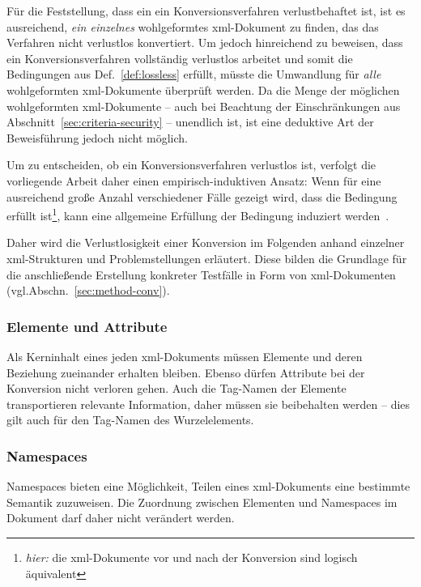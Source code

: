 Für die Feststellung, dass ein ein Konversionsverfahren verlustbehaftet ist, ist es ausreichend, \emph{ein einzelnes} wohlgeformtes \acrshort{xml}-Dokument zu finden, das das Verfahren nicht verlustlos konvertiert. Um jedoch hinreichend zu beweisen, dass ein Konversionsverfahren vollständig verlustlos arbeitet und somit die Bedingungen aus Def.~\ref{def:lossless} erfüllt, müsste die Umwandlung für \emph{alle} wohlgeformten \acrshort{xml}-Dokumente überprüft werden. Da die Menge der möglichen wohlgeformten \acrshort{xml}-Dokumente  -- auch bei Beachtung der Einschränkungen aus Abschnitt~\ref{sec:criteria-security} -- unendlich ist, ist eine deduktive Art der Beweisführung jedoch nicht möglich.

Um zu entscheiden, ob ein Konversionsverfahren verlustlos ist, verfolgt die vorliegende Arbeit daher einen empirisch-induktiven Ansatz: Wenn für eine ausreichend große Anzahl verschiedener Fälle gezeigt wird, dass die Bedingung erfüllt ist\footnote{\emph{hier:} die \acrshort{xml}-Dokumente vor und nach der Konversion sind logisch äquivalent}, kann eine allgemeine Erfüllung der Bedingung induziert werden~\cite[S.~2]{rudner1953judgments}.

Daher wird die Verlustlosigkeit einer Konversion im Folgenden anhand einzelner \acrshort{xml}-Strukturen und Problemstellungen erläutert. Diese bilden die Grundlage für die anschließende Erstellung konkreter Testfälle in Form von \acrshort{xml}-Dokumenten (vgl.\linebreak{}Abschn.~\ref{sec:method-conv}).

\subsubsection{Elemente und Attribute}

Als Kerninhalt eines jeden \acrshort{xml}\hyp{}Dokuments müssen Elemente und deren Beziehung zueinander erhalten bleiben. Ebenso dürfen Attribute bei der Konversion nicht verloren gehen. Auch die Tag\hyp{}Namen der Elemente transportieren relevante Information, daher müssen sie beibehalten werden -- dies gilt auch für den Tag\hyp{}Namen des Wurzelelements.

\subsubsection{Namespaces}

Namespaces bieten eine Möglichkeit, Teilen eines \acrshort{xml}-Dokuments eine bestimmte Semantik zuzuweisen. Die Zuordnung zwischen Elementen und Namespaces im Dokument darf daher nicht verändert werden.

